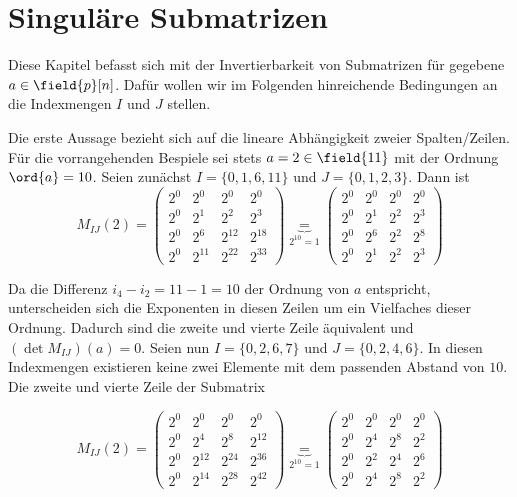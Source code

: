 \section{Singuläre Submatrizen}

Diese Kapitel befasst sich mit der Invertierbarkeit von Submatrizen für gegebene $a \in \field{p}[n]$. Dafür wollen wir im Folgenden hinreichende Bedingungen an die Indexmengen $I$ und $J$ stellen.

Die erste Aussage bezieht sich auf die lineare Abhängigkeit zweier Spalten/Zeilen. Für die vorrangehenden Bespiele sei stets $a = 2 \in \field{11}$ mit der Ordnung $\ord{a} = 10$. Seien zunächst $I=\{0,1,6,11\}$ und $J=\{0,1,2,3\}$. Dann ist 
\begin{equation*}
    M_{IJ}(2) = \begin{pmatrix}
        2^{0} & 2^{0} & 2^{0} & 2^{0} \\
        2^{0} & 2^{1} & 2^{2} & 2^{3} \\
        2^{0} & 2^{6} & 2^{12} & 2^{18} \\
        2^{0} & 2^{11} & 2^{22} & 2^{33} 
    \end{pmatrix} \underbrace{=}_{2^{10}=1} \begin{pmatrix}
        2^{0} & 2^{0} & 2^{0} & 2^{0} \\
        2^{0} & 2^{1} & 2^{2} & 2^{3} \\
        2^{0} & 2^{6} & 2^{2} & 2^{8} \\
        2^{0} & 2^{1} & 2^{2} & 2^{3} 
    \end{pmatrix}
\end{equation*}

Da die Differenz $i_4 - i_2 = 11 - 1 = 10$ der Ordnung von $a$ entspricht, unterscheiden sich die Exponenten in diesen Zeilen um ein Vielfaches dieser Ordnung. Dadurch sind die zweite und vierte Zeile äquivalent und $(\det M_{IJ})(a) = 0$. 
Seien nun $I=\{0,2,6,7\}$ und $J=\{0,2,4,6\}$. In diesen Indexmengen existieren keine zwei Elemente mit dem passenden Abstand von $10$. Die zweite und vierte Zeile der Submatrix

\begin{equation*}
    M_{IJ}(2) = \begin{pmatrix}
        2^{0} & 2^{0} & 2^{0} & 2^{0} \\
        2^{0} & 2^{4} & 2^{8} & 2^{12} \\
        2^{0} & 2^{12} & 2^{24} & 2^{36} \\
        2^{0} & 2^{14} & 2^{28} & 2^{42} 
    \end{pmatrix} \underbrace{=}_{2^{10}=1} \begin{pmatrix}
        2^{0} & 2^{0} & 2^{0} & 2^{0} \\
        2^{0} & 2^{4} & 2^{8} & 2^{2} \\
        2^{0} & 2^{2} & 2^{4} & 2^{6} \\
        2^{0} & 2^{4} & 2^{8} & 2^{2} 
    \end{pmatrix}
\end{equation*}

